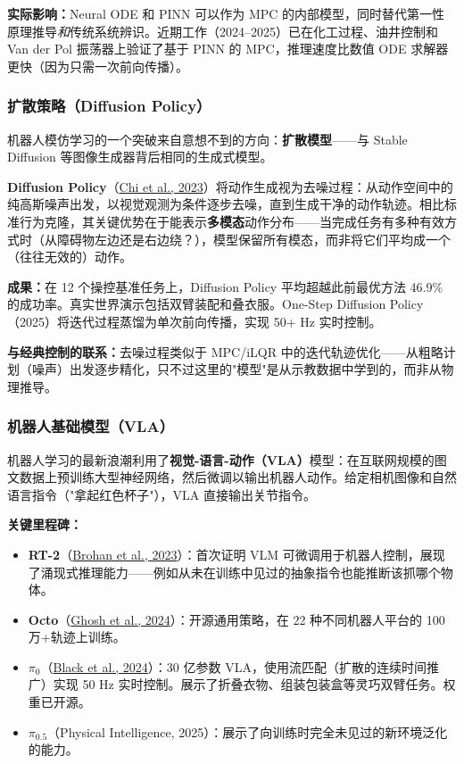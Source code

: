\textbf{实际影响：}Neural ODE 和 PINN 可以作为 MPC 的内部模型，同时替代第一性原理推导\emph{和}传统系统辨识。近期工作（2024--2025）已在化工过程、油井控制和 Van der Pol 振荡器上验证了基于 PINN 的 MPC，推理速度比数值 ODE 求解器更快（因为只需一次前向传播）。

\subsubsection{扩散策略（Diffusion Policy）}

机器人模仿学习的一个突破来自意想不到的方向：\textbf{扩散模型}——与 Stable Diffusion 等图像生成器背后相同的生成式模型。

\textbf{Diffusion Policy}（\href{https://arxiv.org/abs/2303.04137}{Chi et al., 2023}）将动作生成视为去噪过程：从动作空间中的纯高斯噪声出发，以视觉观测为条件逐步去噪，直到生成干净的动作轨迹。相比标准行为克隆，其关键优势在于能表示\textbf{多模态}动作分布——当完成任务有多种有效方式时（从障碍物左边还是右边绕？），模型保留所有模态，而非将它们平均成一个（往往无效的）动作。

\textbf{成果：}在 12 个操控基准任务上，Diffusion Policy 平均超越此前最优方法 46.9\% 的成功率。真实世界演示包括双臂装配和叠衣服。One-Step Diffusion Policy（2025）将迭代过程蒸馏为单次前向传播，实现 50+ Hz 实时控制。

\textbf{与经典控制的联系：}去噪过程类似于 MPC/iLQR 中的迭代轨迹优化——从粗略计划（噪声）出发逐步精化，只不过这里的"模型"是从示教数据中学到的，而非从物理推导。

\subsubsection{机器人基础模型（VLA）}

机器人学习的最新浪潮利用了\textbf{视觉-语言-动作（VLA）}模型：在互联网规模的图文数据上预训练大型神经网络，然后微调以输出机器人动作。给定相机图像和自然语言指令（"拿起红色杯子"），VLA 直接输出关节指令。

\textbf{关键里程碑：}
\begin{itemize}[nosep]
    \item \textbf{RT-2}（\href{https://arxiv.org/abs/2307.15818}{Brohan et al., 2023}）：首次证明 VLM 可微调用于机器人控制，展现了涌现式推理能力——例如从未在训练中见过的抽象指令也能推断该抓哪个物体。
    \item \textbf{Octo}（\href{https://arxiv.org/abs/2405.12213}{Ghosh et al., 2024}）：开源通用策略，在 22 种不同机器人平台的 100 万+轨迹上训练。
    \item \textbf{$\pi_0$}（\href{https://arxiv.org/abs/2410.24164}{Black et al., 2024}）：30 亿参数 VLA，使用流匹配（扩散的连续时间推广）实现 50 Hz 实时控制。展示了折叠衣物、组装包装盒等灵巧双臂任务。权重已开源。
    \item \textbf{$\pi_{0.5}$}（Physical Intelligence, 2025）：展示了向训练时完全未见过的新环境泛化的能力。
\end{itemize}

